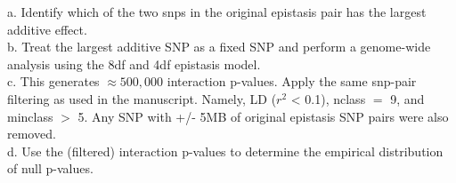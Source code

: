 \documentclass[paper=a4, fontsize=11pt]{scrartcl}					%
\numberwithin{equation}{section}									%
\numberwithin{figure}{section}										%
\numberwithin{table}{section}										%
\begin{document}
a. Identify which of the two snps in the original epistasis pair has the largest additive effect. \\

b. Treat the largest additive SNP as a fixed SNP and perform a genome-wide analysis using the 8df and 4df epistasis model. \\

c. This generates $\approx 500,000$ interaction p-values. Apply the same snp-pair filtering as used in the manuscript. Namely, LD ($r^2$ < 0.1), nclass $=$ 9, and minclass $>$ 5. Any SNP with +/- 5MB of original epistasis SNP pairs were also removed. \\

d.  Use the (filtered) interaction p-values to determine the empirical distribution of null p-values. \\

\newpage
\end{document}
